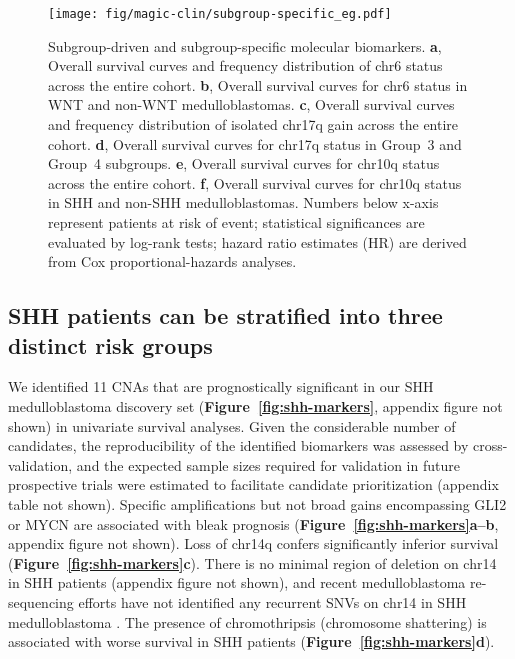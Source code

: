 \documentclass[11pt,letterpaper]{article}
\theoremstyle{definition}
\newcommand{\emphlab}[1]{\textbf{\textsf{#1}}}
\newcommand{\citefig}[1]{\emphlab{Figure~\ref{fig:#1}}}
\begin{document}
\begin{figure}[h]
	\begin{center}
		\texttt{[image: fig/magic-clin/subgroup-specific\_eg.pdf]}
	\end{center}
	\caption[Subgroup-driven and subgroup-specific molecular biomarkers]
	{
	Subgroup-driven and subgroup-specific molecular biomarkers.
	\textbf{a}, Overall survival curves and frequency distribution of chr6 status across the entire cohort.
	\textbf{b}, Overall survival curves for chr6 status in WNT and non-WNT medulloblastomas.		
	\textbf{c}, Overall survival curves and frequency distribution of isolated chr17q gain across the entire cohort.
	\textbf{d}, Overall survival curves for chr17q status in Group~3 and Group~4 subgroups. 
	\textbf{e}, Overall survival curves for chr10q status across the entire cohort.
	\textbf{f}, Overall survival curves for chr10q status in SHH and non-SHH medulloblastomas.
	Numbers below x-axis represent patients at risk of event; statistical significances are evaluated by log-rank tests; hazard ratio estimates (HR) are derived from Cox proportional-hazards analyses.
	}
	\label{fig:subgroup-specific_eg}
\end{figure}

\clearpage

\subsection{SHH patients can be stratified into three distinct risk groups}

We identified 11 CNAs that are prognostically significant in our SHH medulloblastoma discovery set (\citefig{shh-markers}, appendix figure not shown) in univariate survival analyses. Given the considerable number of candidates, the reproducibility of the identified biomarkers was assessed by cross-validation, and the expected sample sizes required for validation in future prospective trials were estimated to facilitate candidate prioritization (appendix table not shown). Specific amplifications but not broad gains encompassing GLI2 or MYCN are associated with bleak prognosis (\citefig{shh-markers}\emphlab{a--b}, appendix figure not shown). Loss of chr14q confers significantly inferior survival (\citefig{shh-markers}\emphlab{c}). There is no minimal region of deletion on chr14 in SHH patients (appendix figure not shown), and recent medulloblastoma re-sequencing efforts have not identified any recurrent SNVs on chr14 in SHH medulloblastoma . The presence of chromothripsis (chromosome shattering) is associated with worse survival in SHH patients (\citefig{shh-markers}\emphlab{d}).
\end{document}
